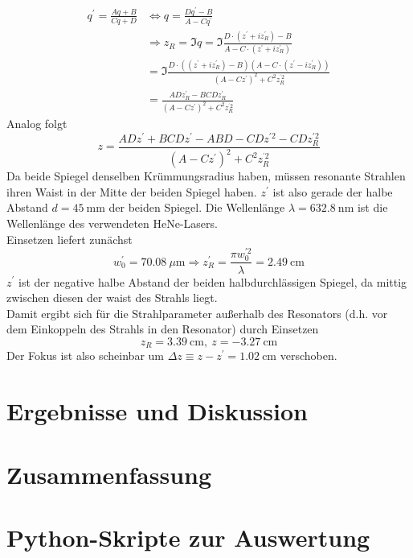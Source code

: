 \documentclass[11pt,a4paper,oneside]{scrartcl}
\begin{document}
\begin{align}
q^\prime=\frac{Aq+B}{Cq+D}& \iff q = \frac{Dq^\prime-B}{A-Cq^\prime}\\ & \Rightarrow z_R=\Im{q}=\Im{\frac{D\cdot (z^\prime+iz_R^\prime)-B}{A-C\cdot(z^\prime+iz_R^\prime)}}\\ \quad&=\Im{\frac{D\cdot ((z^\prime+iz_R^\prime)-B)(A-C\cdot(z^\prime-iz_R^\prime))}{(A-Cz^\prime)^2+C^2z_R^{^\prime 2}}}\\ \quad&
=\frac{ADz_R^\prime-BCDz_R^\prime}{(A-Cz^\prime)^2+C^2z_R^{^\prime 2}}
\end{align}
Analog folgt 
\begin{equation}
z=\frac{ADz^\prime+BCDz^\prime-ABD-CDz^{\prime 2}-CDz_R^{\prime 2}}{(A-Cz^\prime)^2+C^2z_R^{^\prime 2}}
\end{equation}
Da beide Spiegel denselben Krümmungsradius haben, müssen resonante Strahlen ihren Waist in der Mitte der beiden Spiegel haben. $z^\prime$ ist also gerade der halbe Abstand $d=45\ \mathrm{mm}$ der beiden Spiegel. Die Wellenlänge $\lambda=632.8\ \mathrm{nm}$ ist die Wellenlänge des verwendeten HeNe-Lasers. \\
Einsetzen liefert zunächst
\begin{equation}
w_0^\prime = 70.08\ \mu\mathrm m\Rightarrow z_R^\prime = \frac{\pi w_0^{\prime 2}}{\lambda} = 2.49\ \mathrm{cm}
\end{equation}
 $z^\prime$ ist der negative halbe Abstand der beiden halbdurchlässigen Spiegel, da mittig zwischen diesen der waist des Strahls liegt. \\
Damit ergibt sich für die Strahlparameter außerhalb des Resonators (d.h. vor dem Einkoppeln des Strahls in den Resonator) durch Einsetzen
\begin{equation}
z_R = 3.39\ \mathrm{cm},\ z = -3.27\ \mathrm{cm}
\end{equation}
Der Fokus ist also scheinbar um $\Delta z\equiv z-z^\prime = 1.02\ \mathrm{cm}$ verschoben. 


\section{Ergebnisse und Diskussion}
\section{Zusammenfassung}
\newpage

 

\appendix

\section{Python-Skripte zur Auswertung}
\end{document}
